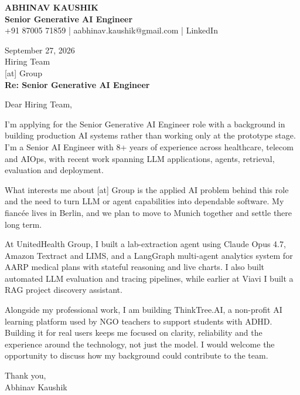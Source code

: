 \documentclass[10pt,a4paper]{article}
\begin{document}
\begin{center}
{\Large\bfseries ABHINAV KAUSHIK}\\[2pt]
{\bfseries Senior Generative AI Engineer}\\[2pt]
+91 87005 71859 \quad | \quad aabhinav.kaushik@gmail.com \quad | \quad LinkedIn
\end{center}
\vspace{8pt}
September 27, 2026\\[6pt]
Hiring Team\\
{[at]} Group\\[4pt]
\textbf{Re: Senior Generative AI Engineer}

Dear Hiring Team,

I’m applying for the Senior Generative AI Engineer role with a background in building production AI systems rather than working only at the prototype stage. I’m a Senior AI Engineer with 8+ years of experience across healthcare, telecom and AIOps, with recent work spanning LLM applications, agents, retrieval, evaluation and deployment.

What interests me about [at] Group is the applied AI problem behind this role and the need to turn LLM or agent capabilities into dependable software. My fiancée lives in Berlin, and we plan to move to Munich together and settle there long term.

At UnitedHealth Group, I built a lab-extraction agent using Claude Opus 4.7, Amazon Textract and LIMS, and a LangGraph multi-agent analytics system for AARP medical plans with stateful reasoning and live charts. I also built automated LLM evaluation and tracing pipelines, while earlier at Viavi I built a RAG project discovery assistant.

Alongside my professional work, I am building ThinkTree.AI, a non-profit AI learning platform used by NGO teachers to support students with ADHD. Building it for real users keeps me focused on clarity, reliability and the experience around the technology, not just the model. I would welcome the opportunity to discuss how my background could contribute to the team.

Thank you,\\
Abhinav Kaushik
\end{document}
